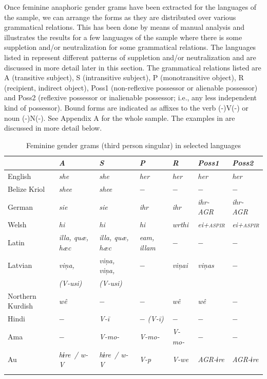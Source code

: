 \documentclass[output=collectionpaper]{langsci/langscibook}
\begin{document}
Once feminine anaphoric gender grams have been extracted for the languages of the sample, we can arrange the forms as they are distributed over various grammatical relations. This has been done by means of manual analysis and  illustrates the results for a few languages of the sample where there is some suppletion and/or neutralization for some grammatical relations. The languages listed in  represent different patterns of suppletion and/or neutralization and are discussed in more detail later in this section. The grammatical relations listed are A (transitive subject), S (intransitive subject), P (monotransitive object), R (recipient, indirect object), Poss1 (non-reflexive possessor or alienable possessor) and Poss2 (reflexive possessor or inalienable possessor; i.e., any less independent kind of possessor). Bound forms are indicated as affixes to the verb (-)V(-) or noun (-)N(-). See Appendix A for the whole sample. The examples in  are discussed in more detail below.

\begin{table}
\begin{tabularx}{\textwidth}{X>{\itshape}X>{\itshape}X>{\itshape}X>{\itshape}X>{\itshape}X>{\itshape}X}
\lsptoprule
& \normalfont	A	&\normalfont	S	&\normalfont P	&	\normalfont R	&	\normalfont Poss1	& \normalfont	Poss2	\\
\midrule
English	&	she	&	she	&	her	&	her	&	her	&	her	\\
Belize Kriol	&	shee	&	shee	&	$-$	&	$-$	&	$-$	&	$-$	\\
German	&	sie	&	sie	&	ihr	&	ihr	&	ihr-{\normalfont AGR}	&	ihr-{\normalfont AGR}	\\
Welsh	&	hi	&	hi	&	hi	&	wrthi	&	ei+{\normalfont\scshape aspir}	&	ei+{\normalfont\scshape aspir}	\\
Latin	&	illa, quæ, hæc	&	illa, quæ, hæc	&	eam, illam	&	$-$	&	$-$	&	$-$	\\
Latvian	&	viņa,	&	viņa, viņa,	&	$-$	&	viņai	&	viņas	&	$-$	\\
&	{\normalfont (V-\textit{usi})}	&	{\normalfont (V-\textit{usi})}	&		&		&		&		\\
Northern Kurdish	&	wê	&	$-$	&	$-$	&	wê	&	wê	&	$-$	\\
Hindi	&	$-$	&	{\normalfont V}-ī	&	$-$ {\normalfont (V-\textit{ī})}	&	$-$	&	$-$	&	$-$	\\
Ama	&	$-$	&	{\normalfont V}-mo-	&	{\normalfont V}-mo-	&	{\normalfont V}-mo-	&	$-$	&	$-$	\\
Au	&	\mbox{hɨre /} \mbox{w-{\normalfont V}}	&	\mbox{hɨre /} \mbox{w-{\normalfont V}}	&	{\normalfont V}-p	&	{\normalfont V}-we	&	{\normalfont AGR}-ɨre	&	{\normalfont AGR}-ɨre	\\
\lspbottomrule
\end{tabularx}
\caption{Feminine gender grams (third person singular) in selected languages}
\label{tab:BW:5}
\end{table}
\end{document}
